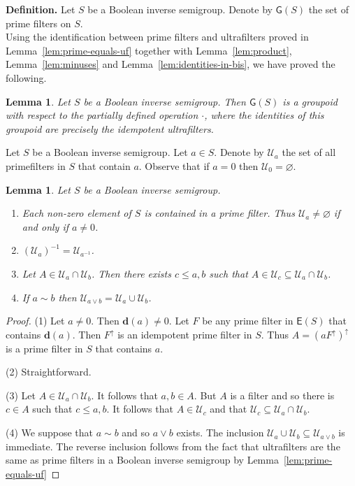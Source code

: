 \documentclass[a4paper]{amsart}
\newtheorem{lemma}[theorem]{Lemma}
\begin{document}
\noindent
{\bf Definition. }
Let $S$ be a Boolean inverse semigroup. 
Denote by $\mathsf{G}(S)$ the set of prime filters on $S$.\\

Using the identification between prime filters and ultrafilters proved in
Lemma~\ref{lem:prime-equals-uf} together with Lemma~\ref{lem:product}, Lemma~\ref{lem:minuses} and Lemma~\ref{lem:identities-in-bis},
we have proved the following.

\begin{lemma}\label{lem:groupoid-bis} Let $S$ be a Boolean inverse semigroup.
Then $\mathsf{G}(S)$ is a groupoid with respect to the partially defined operation $\cdot$,
where the identities of this groupoid are precisely the idempotent ultrafilters.
\end{lemma}


Let $S$ be a Boolean inverse semigroup.
Let $a \in S$.
Denote by $\mathscr{U}_{a}$ the set of all primefilters in $S$ that contain $a$.
Observe that if $a = 0$ then $\mathscr{U}_{0} = \varnothing$.

\begin{lemma}\label{lem:primefilters-form-a-base}
Let $S$ be a Boolean inverse semigroup.
\begin{enumerate}
\item Each non-zero element of $S$ is contained in a prime filter.
Thus $\mathscr{U}_{a} \neq \varnothing$ if and only if $a \neq 0$.
\item $\left( \mathscr{U}_{a} \right)^{-1} = \mathscr{U}_{a^{-1}}$.
\item Let $A \in \mathscr{U}_{a} \cap \mathscr{U}_{b}$.
Then there exists $c \leq a,b$ such that $A \in \mathscr{U}_{c} \subseteq \mathscr{U}_{a} \cap \mathscr{U}_{b}$.
\item If $a \sim b$ then $\mathscr{U}_{a \vee b} = \mathscr{U}_{a} \cup \mathscr{U}_{b}$.
\end{enumerate}
\end{lemma}
\begin{proof}
(1) Let $a \neq 0$.
Then $\mathbf{d}(a) \neq 0$.
Let $F$ be any prime filter in $\mathsf{E}(S)$ that contains $\mathbf{d}(a)$.
Then $F^{\uparrow}$ is an idempotent prime filter in $S$.
Thus $A = (aF^{\uparrow})^{\uparrow}$ is a prime filter in $S$ that contains $a$.

(2) Straightforward.

(3) Let $A \in \mathscr{U}_{a} \cap \mathscr{U}_{b}$.  
It follows that $a,b \in A$.
But $A$ is a filter and so there is $c \in A$ such that $c \leq a,b$.
It follows that $A \in \mathscr{U}_{c}$ and that $\mathscr{U}_{c} \subseteq \mathscr{U}_{a} \cap \mathscr{U}_{b}$.

(4) We suppose that $a \sim b$ and so $a \vee b $ exists.
The inclusion $\mathscr{U}_{a} \cup \mathscr{U}_{b} \subseteq \mathscr{U}_{a \vee b}$ is immediate.
The reverse inclusion follows from the fact that ultrafilters are the same as prime filters in
a Boolean inverse semigroup by Lemma~\ref{lem:prime-equals-uf} 
\end{proof}
\end{document}
